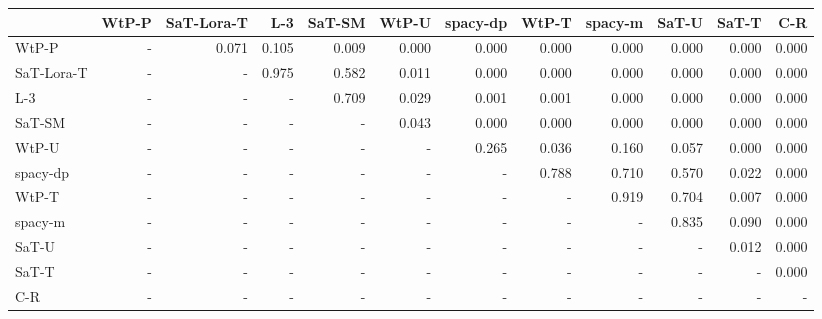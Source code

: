 \begin{tabular}{lrrrrrrrrrrr}
\toprule
 & WtP-P & SaT-Lora-T & L-3 & SaT-SM & WtP-U & spacy-dp & WtP-T & spacy-m & SaT-U & SaT-T & C-R \\
\midrule
WtP-P & - & 0.071 & 0.105 & 0.009 & 0.000 & 0.000 & 0.000 & 0.000 & 0.000 & 0.000 & 0.000 \\
SaT-Lora-T & - & - & 0.975 & 0.582 & 0.011 & 0.000 & 0.000 & 0.000 & 0.000 & 0.000 & 0.000 \\
L-3 & - & - & - & 0.709 & 0.029 & 0.001 & 0.001 & 0.000 & 0.000 & 0.000 & 0.000 \\
SaT-SM & - & - & - & - & 0.043 & 0.000 & 0.000 & 0.000 & 0.000 & 0.000 & 0.000 \\
WtP-U & - & - & - & - & - & 0.265 & 0.036 & 0.160 & 0.057 & 0.000 & 0.000 \\
spacy-dp & - & - & - & - & - & - & 0.788 & 0.710 & 0.570 & 0.022 & 0.000 \\
WtP-T & - & - & - & - & - & - & - & 0.919 & 0.704 & 0.007 & 0.000 \\
spacy-m & - & - & - & - & - & - & - & - & 0.835 & 0.090 & 0.000 \\
SaT-U & - & - & - & - & - & - & - & - & - & 0.012 & 0.000 \\
SaT-T & - & - & - & - & - & - & - & - & - & - & 0.000 \\
C-R & - & - & - & - & - & - & - & - & - & - & - \\
\bottomrule
\end{tabular}

